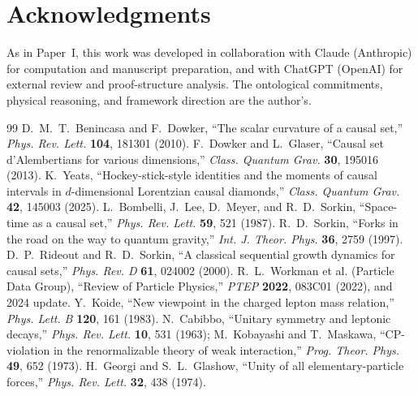 \documentclass[11pt]{article}
\begin{document}
\section*{Acknowledgments}

As in Paper~I, this work was developed in collaboration with Claude (Anthropic) for computation and manuscript preparation, and with ChatGPT (OpenAI) for external review and proof-structure analysis. The ontological commitments, physical reasoning, and framework direction are the author's.

\begin{thebibliography}{99}
 D.~M.~T.~Benincasa and F.~Dowker, ``The scalar curvature of a causal set,'' \emph{Phys. Rev. Lett.} \textbf{104}, 181301 (2010).
 F.~Dowker and L.~Glaser, ``Causal set d'Alembertians for various dimensions,'' \emph{Class. Quantum Grav.} \textbf{30}, 195016 (2013).
 K.~Yeats, ``Hockey-stick-style identities and the moments of causal intervals in $d$-dimensional Lorentzian causal diamonds,'' \emph{Class. Quantum Grav.} \textbf{42}, 145003 (2025).
 L.~Bombelli, J.~Lee, D.~Meyer, and R.~D.~Sorkin, ``Space-time as a causal set,'' \emph{Phys. Rev. Lett.} \textbf{59}, 521 (1987).
 R.~D.~Sorkin, ``Forks in the road on the way to quantum gravity,'' \emph{Int. J. Theor. Phys.} \textbf{36}, 2759 (1997).
 D.~P.~Rideout and R.~D.~Sorkin, ``A classical sequential growth dynamics for causal sets,'' \emph{Phys. Rev. D} \textbf{61}, 024002 (2000).
 R.~L.~Workman et al. (Particle Data Group), ``Review of Particle Physics,'' \emph{PTEP} \textbf{2022}, 083C01 (2022), and 2024 update.
 Y.~Koide, ``New viewpoint in the charged lepton mass relation,'' \emph{Phys. Lett. B} \textbf{120}, 161 (1983).
 N.~Cabibbo, ``Unitary symmetry and leptonic decays,'' \emph{Phys. Rev. Lett.} \textbf{10}, 531 (1963); M.~Kobayashi and T.~Maskawa, ``CP-violation in the renormalizable theory of weak interaction,'' \emph{Prog. Theor. Phys.} \textbf{49}, 652 (1973).
 H.~Georgi and S.~L.~Glashow, ``Unity of all elementary-particle forces,'' \emph{Phys. Rev. Lett.} \textbf{32}, 438 (1974).
\end{thebibliography}
\end{document}

